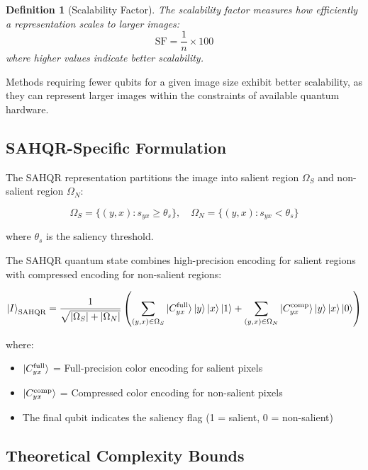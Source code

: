 \documentclass[pdflatex,sn-mathphys-num,Numbered]{sn-jnl}
\theoremstyle{thmstyleone}
\theoremstyle{thmstyletwo}
\theoremstyle{thmstylethree}
\newtheorem{definition}{Definition}
\begin{document}
\begin{definition}[Scalability Factor]
The scalability factor measures how efficiently a representation scales to larger images:
\begin{equation}
\text{SF} = \frac{1}{n} \times 100
\label{eq:scalability}
\end{equation}
where higher values indicate better scalability.
\end{definition}

Methods requiring fewer qubits for a given image size exhibit better scalability, as they can represent larger images within the constraints of available quantum hardware.

\subsection{SAHQR-Specific Formulation}

The SAHQR representation partitions the image into salient region $\Omega_S$ and non-salient region $\Omega_N$:

\begin{equation}
\Omega_S = \{(y, x) : s_{yx} \geq \theta_s\}, \quad \Omega_N = \{(y, x) : s_{yx} < \theta_s\}
\label{eq:partition}
\end{equation}

where $\theta_s$ is the saliency threshold.

The SAHQR quantum state combines high-precision encoding for salient regions with compressed encoding for non-salient regions:

\begin{equation}
\ket{I}_{\text{SAHQR}} = \frac{1}{\sqrt{|\Omega_S| + |\Omega_N|}} \left( \sum_{(y,x) \in \Omega_S} \ket{C_{yx}^{\text{full}}} \ket{y} \ket{x} \ket{1} + \sum_{(y,x) \in \Omega_N} \ket{C_{yx}^{\text{comp}}} \ket{y} \ket{x} \ket{0} \right)
\label{eq:sahqr_state}
\end{equation}

where:
\begin{itemize}
\item $\ket{C_{yx}^{\text{full}}}$ = Full-precision color encoding for salient pixels
\item $\ket{C_{yx}^{\text{comp}}}$ = Compressed color encoding for non-salient pixels
\item The final qubit indicates the saliency flag (1 = salient, 0 = non-salient)
\end{itemize}

\subsection{Theoretical Complexity Bounds}
\end{document}

